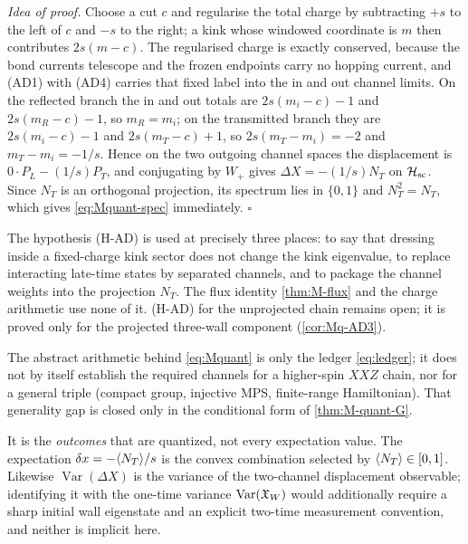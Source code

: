 \noindent\emph{Idea of proof.} Choose a cut $c$ and regularise the total charge
by subtracting $+s$ to the left of $c$ and $-s$ to the right; a kink whose
windowed coordinate is $m$ then contributes $2s(m-c)$. The regularised charge
is exactly conserved, because the bond currents telescope and the frozen
endpoints carry no hopping current, and (AD1) with (AD4) carries that fixed
label into the in and out channel limits. On the reflected branch the in and out
totals are $2s(m_i-c)-1$ and $2s(m_R-c)-1$, so $m_R=m_i$; on the transmitted
branch they are $2s(m_i-c)-1$ and $2s(m_T-c)+1$, so $2s(m_T-m_i)=-2$ and
$m_T-m_i=-1/s$. Hence on the two outgoing channel spaces the displacement is
$0\cdot P_L-(1/s)P_T$, and conjugating by $W_+$ gives $\Delta X=-(1/s)N_T$ on
$\mathcal{H}_{\mathrm{sc}}$. Since $N_T$ is an orthogonal projection, its spectrum
lies in $\{0,1\}$ and $N_T^2=N_T$, which gives \eqref{eq:Mquant-spec}
immediately. \hfill$\square$

\begin{scope}
\label{scope:M-quant}
The hypothesis (H-AD) is used at precisely three places: to say that dressing
inside a fixed-charge kink sector does not change the kink eigenvalue, to
replace interacting late-time states by separated channels, and to package the
channel weights into the projection $N_T$. The flux identity
\cref{thm:M-flux} and the charge arithmetic use none of it. (H-AD) for the
unprojected chain remains open; it is proved only for the projected
three-wall component (\cref{cor:Mq-AD3}).

The abstract arithmetic behind \eqref{eq:Mquant} is only the ledger
\eqref{eq:ledger}; it does not by itself establish the required channels for a
higher-spin $XXZ$ chain, nor for a general triple (compact group, injective
MPS, finite-range Hamiltonian). That generality gap is closed only in the
conditional form of \cref{thm:M-quant-G}.

It is the \emph{outcomes} that are quantized, not every expectation value. The
expectation $\delta x=-\langle N_T\rangle/s$ is the convex combination selected by
$\langle N_T\rangle\in[0,1]$. Likewise $\operatorname{Var}(\Delta X)$ is the variance
of the two-channel displacement observable; identifying it with the one-time
variance $\operatorname{Var}(\mathfrak{X}_W)$ would additionally require a sharp
initial wall eigenstate and an explicit two-time measurement convention, and
neither is implicit here.
\end{scope}

